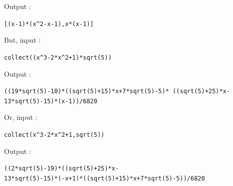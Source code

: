 \documentclass[a4paper,11pt]{book}
\begin{document}
\begin{itemize}
Output :
\begin{center}{\tt  [(x-1)*(x\verb|^|2-x-1),x*(x-1)]}\end{center}
But, input :
 \begin{center}{\tt collect((x\verb|^|3-2*x\verb|^|2+1)*sqrt(5))}\end{center}
Output :
\begin{center}{\tt ((19*sqrt(5)-10)*((sqrt(5)+15)*x+7*sqrt(5)-5)* ((sqrt(5)+25)*x-13*sqrt(5)-15)*(x-1))/6820}\end{center}
Or, input :
\begin{center}{\tt collect(x\verb|^|3-2*x\verb|^|2+1,sqrt(5))}\end{center}
Output :
\begin{center}{\tt ((2*sqrt(5)-19)*((sqrt(5)+25)*x-}\\
              {\tt 13*sqrt(5)-15)*(-x+1)*((sqrt(5)+15)*x+7*sqrt(5)-5))/6820}
\end{center}
\end{itemize}
\end{document}
